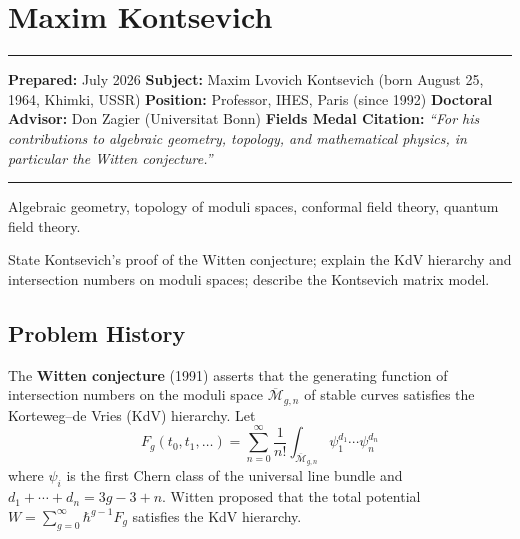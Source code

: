 \chapter{Maxim Kontsevich}\label{ch1998maximkontsevich:maxim-kontsevich-fields-medal-1998-a-comprehensive-report-on-his-work-and-impact}

\begin{center}\rule{0.5\linewidth}{0.5pt}\end{center}

\textbf{Prepared:} July 2026
\textbf{Subject:} Maxim Lvovich Kontsevich (born August 25, 1964, Khimki, USSR)
\textbf{Position:} Professor, IHES, Paris (since 1992)
\textbf{Doctoral Advisor:} Don Zagier (Universitat Bonn)
\textbf{Fields Medal Citation:} \emph{``For his contributions to algebraic
geometry, topology, and mathematical physics, in particular the
Witten conjecture.''}

\begin{center}\rule{0.5\linewidth}{0.5pt}\end{center}

\begin{prereqs}
Algebraic geometry, topology of moduli spaces, conformal field
theory, quantum field theory.
\end{prereqs}

\begin{objectives}
State Kontsevich's proof \cite{kontsevich1992} of the Witten conjecture; explain the KdV
hierarchy and intersection numbers on moduli spaces; describe the
Kontsevich matrix model.
\end{objectives}

\section{Problem History}

The \textbf{Witten conjecture} (1991) asserts that the generating
function of intersection numbers on the moduli space
$\overline{\mathcal{M}}_{g,n}$ of stable curves satisfies the
Korteweg--de Vries (KdV) hierarchy.  Let
\[
  F_g(t_0,t_1,\ldots)
  = \sum_{n=0}^{\infty}\frac{1}{n!}
    \int_{\overline{\mathcal{M}}_{g,n}}
    \psi_1^{d_1}\cdots\psi_n^{d_n}
\]
where $\psi_i$ is the first Chern class of the universal line
bundle and $d_1+\cdots+d_n=3g-3+n$.  Witten proposed that the
total potential $W=\sum_{g=0}^{\infty}\hbar^{g-1}F_g$ satisfies
the KdV hierarchy.

